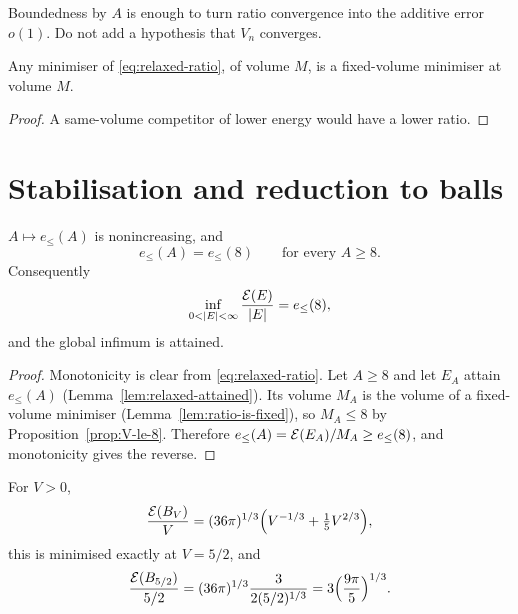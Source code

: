 \begin{fnote}\label{fnote:no-Vn-convergence}
Boundedness by $A$ is enough to turn ratio convergence into the additive error
$o(1)$.  Do not add a hypothesis that $V_n$ converges.
\end{fnote}

\begin{lemma}\label{lem:ratio-is-fixed}
Any minimiser of \eqref{eq:relaxed-ratio}, of volume $M$, is a fixed-volume
minimiser at volume $M$.
\end{lemma}

\begin{proof}
A same-volume competitor of lower energy would have a lower ratio.
\end{proof}

\section{Stabilisation and reduction to balls}

\begin{lemma}\label{lem:stabilization}
$A\mapsto e_\le(A)$ is nonincreasing, and
\begin{equation}\label{eq:stabilization}
  e_\le(A)=e_\le(8)\qquad\text{for every }A\ge8 .
\end{equation}
Consequently
\begin{equation}\label{eq:global-inf}
  \inf_{0<|E|<\infty}\frac{\Ec(E)}{|E|}=e_\le(8),
\end{equation}
and the global infimum is attained.
\end{lemma}

\begin{proof}
Monotonicity is clear from \eqref{eq:relaxed-ratio}.  Let $A\ge8$ and let
$E_A$ attain $e_\le(A)$ (Lemma~\ref{lem:relaxed-attained}).  Its volume
$M_A$ is the volume of a fixed-volume minimiser
(Lemma~\ref{lem:ratio-is-fixed}), so $M_A\le8$ by
Proposition~\ref{prop:V-le-8}.  Therefore
$e_\le(A)=\mathcal E(E_A)/M_A\ge e_\le(8)$, and monotonicity gives the reverse.
\end{proof}

\begin{lemma}\label{lem:optimal-ball-volume}
For $V>0$,
\begin{equation}\label{eq:ball-ratio}
  \frac{\mathcal E(B_V)}{V}
  =(36\pi)^{1/3}\Bigl(V^{-1/3}+\tfrac15V^{2/3}\Bigr),
\end{equation}
this is minimised exactly at $V=5/2$, and
\begin{equation}\label{eq:e-star-value}
  \frac{\mathcal E(B_{5/2})}{5/2}
  =(36\pi)^{1/3}\frac{3}{2(5/2)^{1/3}}
  =3\Bigl(\frac{9\pi}{5}\Bigr)^{1/3}.
\end{equation}
\end{lemma}

